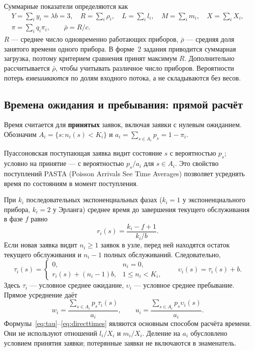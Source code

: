 \documentclass[a4paper,12pt]{article}
\begin{document}
Суммарные показатели определяются как
\begin{gather}
Y=\sum_i y_i=\lambda b=3,\quad R=\sum_i\rho_i,\quad
L=\sum_i l_i,\quad M=\sum_i m_i,\quad X=\sum_iX_i,\\
\pi=\sum_iq_i\pi_i,\qquad \bar\rho=R/c.
\end{gather}
$R$ --- среднее число одновременно работающих приборов, $\bar\rho$ --- средняя доля занятого времени одного прибора. В форме~2 задания приводится суммарная загрузка, поэтому критерием сравнения принят максимум $R$. Дополнительно рассчитывается $\bar\rho$, чтобы учитывать различное число приборов. Вероятности потерь \emph{взвешиваются} по долям входного потока, а не складываются без весов.

\subsection{Времена ожидания и пребывания: прямой расчёт}\label{sec:times}
Время считается для \textbf{принятых} заявок, включая заявки с нулевым ожиданием. Обозначим $A_i=\{s:n_i(s)<K_i\}$ и $a_i=\sum_{s\in A_i}p_s=1-\pi_i$.

Пуассоновская поступающая заявка видит состояние $s$ с вероятностью $p_s$; условно на принятие --- с вероятностью $p_s/a_i$ для $s\in A_i$. Это свойство поступлений PASTA (Poisson Arrivals See Time Averages) позволяет усреднять время по состояниям в момент поступления.

При $k_i$ последовательных экспоненциальных фазах ($k_i=1$ у экспоненциального прибора, $k_i=2$ у Эрланга) среднее время до завершения текущего обслуживания в фазе $f$ равно
\[
r_i(s)=\frac{k_i-f+1}{k_i/b}.
\]
Если новая заявка видит $n_i\ge1$ заявок в узле, перед ней находятся остаток текущего обслуживания и $n_i-1$ полных обслуживаний. Следовательно,
\begin{equation}\label{eq:tau}
\tau_i(s)=\begin{cases}
0,&n_i=0,\\
r_i(s)+(n_i-1)b,&1\le n_i<K_i,
\end{cases}\qquad
\upsilon_i(s)=\tau_i(s)+b.
\end{equation}
Здесь $\tau_i$ --- условное среднее ожидание, $\upsilon_i$ --- условное среднее пребывание. Прямое усреднение даёт
\begin{equation}\label{eq:directtimes}
\boxed{\displaystyle
w_i=\frac{\sum_{s\in A_i}p_s\tau_i(s)}{a_i},\qquad
u_i=\frac{\sum_{s\in A_i}p_s\upsilon_i(s)}{a_i}.}
\end{equation}
Формулы~\eqref{eq:tau}--\eqref{eq:directtimes} являются основным способом расчёта времени. Они не используют отношений $l_i/X_i$ и $m_i/X_i$. Деление на $a_i$ обусловлено условием принятия заявки; потерянные заявки не включаются в знаменатель.
\end{document}
